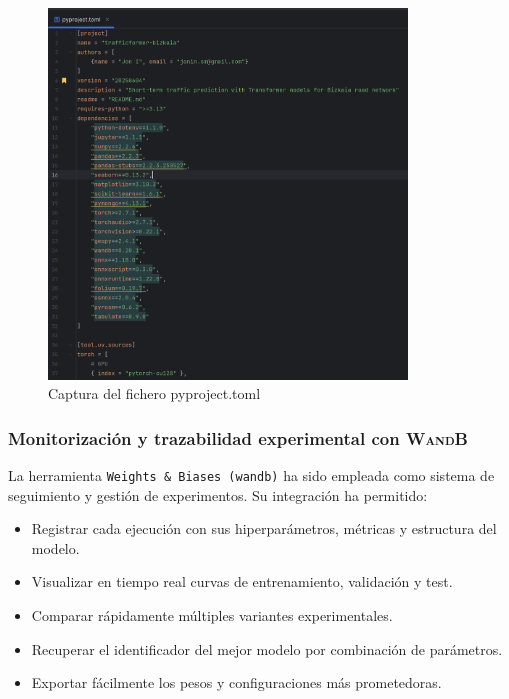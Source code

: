 \begin{figure}[H]
	\centering
	\includegraphics[width=0.85\textwidth]{includes/cap5/captura_pyproject_toml.png}
	\caption{Captura del fichero pyproject.toml}
	\label{fig:capt_pyproject}
\end{figure}

\subsubsection*{Monitorización y trazabilidad experimental con W\textsc{and}B}

La herramienta \texttt{Weights \& Biases (wandb)} ha sido empleada como sistema de seguimiento y gestión de experimentos. Su integración ha permitido:

\begin{itemize}
	\item Registrar cada ejecución con sus hiperparámetros, métricas y estructura del modelo.
	\item Visualizar en tiempo real curvas de entrenamiento, validación y test.
	\item Comparar rápidamente múltiples variantes experimentales.
	\item Recuperar el identificador del mejor modelo por combinación de parámetros.
	\item Exportar fácilmente los pesos y configuraciones más prometedoras.
\end{itemize}

